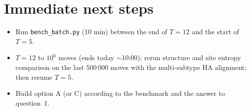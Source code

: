 \documentclass[11pt,a4paper]{article}
\newcommand{\file}[1]{\texttt{#1}}
\begin{document}
\section*{Immediate next steps}
\begin{itemize}
\item Run \file{bench\_batch.py} (10 min) between the end of $T=12$ and the start of $T=5$.
\item $T=12$ to $10^6$ moves (ends today $\sim$10:00); rerun structure and site
  entropy comparison on the last 500\,000 moves with the multi-subtype HA
  alignment; then resume $T=5$.
\item Build option A (or C) according to the benchmark and the answer to
  question~1.
\end{itemize}
\end{document}
